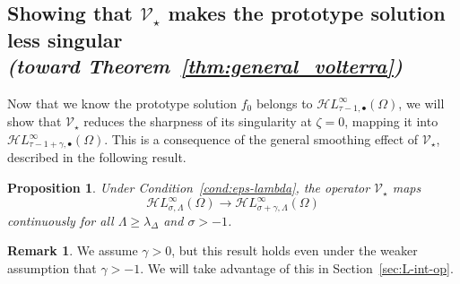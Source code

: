 \documentclass{article}
\theoremstyle{definition}
\newtheorem{rmk}{Remark}
\theoremstyle{plain}
\newtheorem{proposition}{Proposition}
\newcommand{\singexp}[2]{\mathcal{H}L^\infty_{#1, #2}}
\newcommand{\singexpalg}[1]{\singexp{#1}{\bullet}}
\newcommand{\softpart}{\mathcal{V}_\star}
\newcommand{\solproto}{f_0}
\newcommand{\domain}{\Omega}
\begin{document}
\subsection{Showing that $\softpart$ makes the prototype solution less singular \\ \textit{(toward Theorem~\ref{thm:general_volterra})}}\label{sec:image under soft_part}
Now that we know the prototype solution $\solproto$ belongs to $\singexpalg{\tau-1}(\domain)$, we will show that $\softpart$ reduces the sharpness of its singularity at $\zeta = 0$, mapping it into $\singexpalg{\tau-1+\gamma}(\domain)$. This is a consequence of the general smoothing effect of $\softpart$, described in the following result.

\begin{proposition}\label{prop:smoothing}
Under {\em Condition~\eqref{cond:eps-lambda}}, the operator $\softpart$ maps
\[ \singexp{\sigma}{\Lambda}(\Omega) \to \singexp{\sigma+\gamma}{\Lambda}(\Omega) \]
continuously for all $\Lambda\geq \lambda_{\Delta}$ and $\sigma>-1$.
\end{proposition}
\begin{rmk}
We assume $\gamma > 0$, but this result holds even under the weaker assumption that $\gamma > -1$. We will take advantage of this in Section~\ref{sec:L-int-op}.
\end{rmk}
\end{document}
